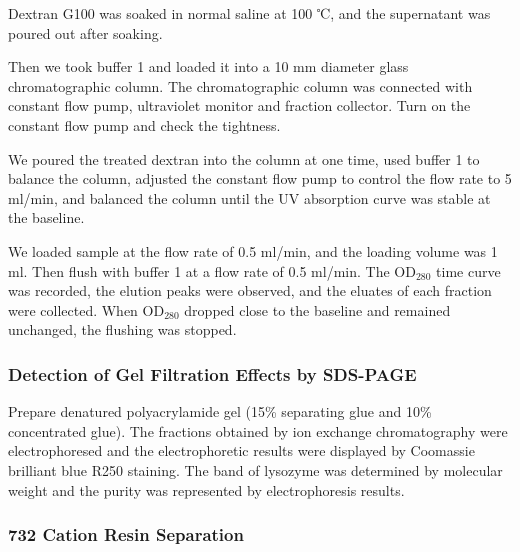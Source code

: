 Dextran G100 was soaked in normal saline at 100 ℃, and the supernatant
was poured out after soaking.

Then we took buffer 1 and loaded it into a 10 mm diameter glass
chromatographic column. The chromatographic column was connected with
constant flow pump, ultraviolet monitor and fraction collector. Turn on
the constant flow pump and check the tightness.

We poured the treated dextran into the column at one time, used buffer 1
to balance the column, adjusted the constant flow pump to
control the flow rate to 5 ml/min, and balanced the column until the
UV absorption curve was stable at the baseline.

We loaded sample at the flow rate of 0.5 ml/min, and the loading volume was 1 ml. Then flush with buffer 1 at a flow rate of 0.5 ml/min. The $\mathrm{OD_{280}}$ time curve was recorded, the elution peaks were observed,
and the eluates of each fraction were collected. When $\mathrm{OD_{280}}$ dropped
close to the baseline and remained unchanged, the flushing was stopped.



\hypertarget{header-n23}{%
\subsubsection{Detection of Gel Filtration Effects by SDS-PAGE \citep{SDSfor}}}

Prepare denatured polyacrylamide gel (15\% separating glue and 10\%
concentrated glue). The fractions obtained by ion exchange
chromatography were electrophoresed and the electrophoretic results were
displayed by Coomassie brilliant blue R250 staining. The band of lysozyme was determined by molecular weight and the purity  was represented by electrophoresis results. 



\subsubsection{732 Cation Resin Separation \citep{Hu2015,Lin2002,732}}

